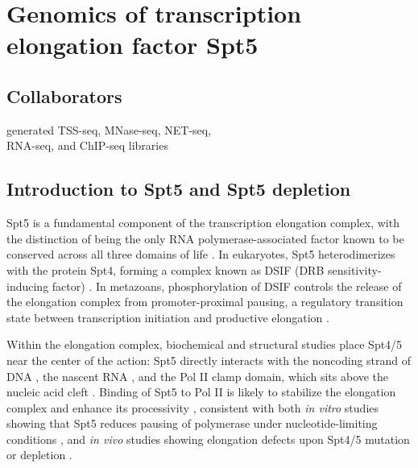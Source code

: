 \chapter{Genomics of transcription elongation factor Spt5}
\label{chapter:five}

\section{Collaborators}

\begin{description}[align=right, leftmargin=!, labelwidth=5cm, noitemsep]
    \item [Ameet Shetty] generated TSS-seq, MNase-seq, NET-seq,\\RNA-seq, and ChIP-seq libraries
\end{description}

\section{Introduction to Spt5 and Spt5 depletion}

Spt5 is a fundamental component of the transcription elongation complex, with the distinction of being the only RNA polymerase-associated factor known to be conserved across all three domains of life \citep{hartzog2013, werner2012}.
In eukaryotes, Spt5 heterodimerizes with the protein Spt4, forming a complex known as DSIF (DRB sensitivity-inducing factor) \citep{hartzog1998,hirtreiter2010,schwer2009,wada1998}.
In metazoans, phosphorylation of DSIF controls the release of the elongation complex from promoter-proximal pausing, a regulatory transition state between transcription initiation and productive elongation \citep{adelman2012}.

Within the elongation complex, biochemical and structural studies place Spt4/5 near the center of the action: Spt5 directly interacts with the noncoding strand of DNA \citep{crickard2016,meyer2015}, the nascent RNA \citep{blythe2016, crickard2016,meyer2015}, and the Pol II clamp domain, which sits above the nucleic acid cleft \citep{hirtreiter2010, martinez-rucobo2011, viktorovskaya2011, yamaguchi1999}.
Binding of Spt5 to Pol II is likely to stabilize the elongation complex and enhance its processivity \citep{hirtreiter2010,klein2011,martinez-rucobo2011}, consistent with both \textit{in vitro} studies showing that Spt5 reduces pausing of polymerase under nucleotide-limiting conditions \citep{guo2000,wada1998,zhu2007}, and \textit{in vivo} studies showing elongation defects upon Spt4/5 mutation or depletion \citep{diamant2016,kramer2016,liu2012,mason2005,morillon2003,quan2010,rondon2003}.

